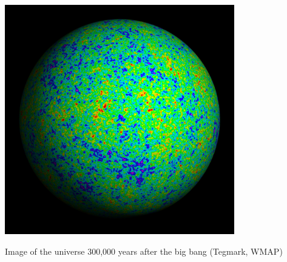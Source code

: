 \documentclass{beamer}
\begin{document}
\frame
{
    \begin{center}
        \includegraphics[width=0.75\textwidth]{wiener3yr_map_2284x2284.jpg}
    \end{center}
    {\normalsize Image of the universe 300,000 years after the big bang (Tegmark, WMAP)}
}
\end{document}
